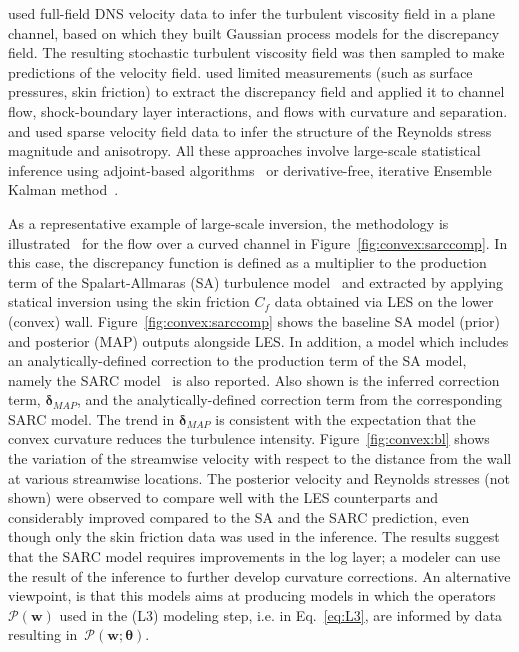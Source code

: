 \documentclass[a4paper]{ar-1col}
\begin{document}
\citet{dow2011quantification} used full-field DNS velocity data to infer the turbulent viscosity field in a plane channel, based on which they built  Gaussian process models for the discrepancy field. The resulting stochastic turbulent viscosity field was then sampled to make predictions of the velocity field.
\citet{duraisamy2015new,singh2016using} used limited measurements (such as surface pressures, skin friction) to extract 
the  discrepancy field 
and applied it to channel flow, shock-boundary layer interactions, and flows with curvature and separation. 
\citet{xiao2016quantifying} and \citet{wu2016bayesian} used sparse velocity field data to infer the structure of the  Reynolds stress magnitude and anisotropy. 
All these approaches involve large-scale statistical inference
 using adjoint-based algorithms~\citep{giles2003algorithm} or derivative-free, iterative Ensemble Kalman method~\citep{iglesias2013ensemble}.

As a representative example of large-scale inversion, the methodology is illustrated~\citep{singh2016using} for the flow over a curved channel in Figure~\ref{fig:convex:sarccomp}. In this case, the discrepancy function is defined 
 as a multiplier to the production term of the Spalart-Allmaras (SA) turbulence model~\citep{spalart1992one-equation} and extracted by applying statical inversion using the skin friction $C_f$ data obtained via LES on the lower (convex) wall. Figure~\ref{fig:convex:sarccomp} shows the baseline SA model (prior) and posterior (MAP) outputs alongside LES. In
 addition, a  model which includes an analytically-defined correction to the production term of the SA model, namely the SARC model~\citep{shur2000turbulence} is also reported.
Also shown is the inferred correction term, $\bm{\delta}_{MAP}$, and the analytically-defined correction term from the corresponding SARC model.
The trend in $\bm{\delta}_{MAP}$ is consistent with the expectation that the convex curvature reduces the turbulence intensity.
Figure~\ref{fig:convex:bl} shows the variation of the streamwise velocity with respect to the distance from the wall at various streamwise locations. The posterior velocity and Reynolds stresses (not shown) were observed to compare well with the LES counterparts and considerably improved compared to the SA and the SARC prediction, even though only the skin friction data was used in the inference. The results suggest that the SARC model requires improvements in the log layer; a modeler can use the result of the inference to further develop curvature corrections. An alternative viewpoint,
is that this models aims at producing models in which the operators $\mathcal{P}(\mathbf{w})$ used in the (L3) modeling step, i.e. in Eq.~\ref{eq:L3}, are informed by data resulting in~${\mathcal{P}}(\mathbf{w};\bm{\theta})$.
\end{document}
